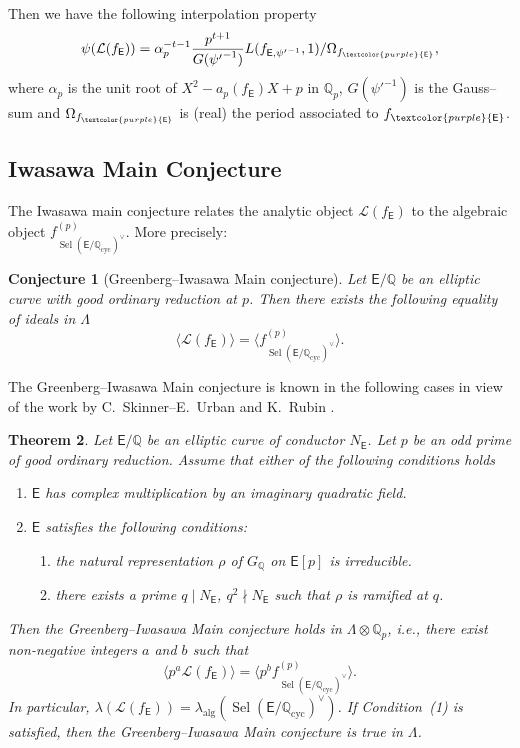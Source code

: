 \documentclass{amsart}
\newcommand{\DK}[1]{\textcolor{purple}{#1}}
\newtheorem{theorem}{Theorem}[section]
\newtheorem{conj}[theorem]{Conjecture}
\numberwithin{equation}{section}
\theoremstyle{remark}
\newcommand{\cyc}{\operatorname{cyc}}
\newcommand{\Sel}{\operatorname{Sel}}
\newcommand{\alg}{\operatorname{alg}}
\newcommand{\Qp}{\mathbb{Q}_p}
\newcommand{\Q}{\mathbb{Q}}
\newcommand{\EC}{\mathsf{E}}
\theoremstyle{plain} %
\begin{document}
Then we have the following interpolation property \cite[Section 14]{MTT}
\[
\psi(\mathcal{L}(f_{\EC}))=\alpha_p^{-t-1}\frac{p^{t+1}}{G({\psi'}^{-1})}L(f_{\EC, {\psi'}^{-1}},1)/\Omega_{f_{\DK{\EC}}},
\]
where $\alpha_p$ is the unit root of $X^2-a_p(f_{\EC})X+p$ in $\Qp$, $G(\psi'^{-1})$ is the Gauss--sum and $\Omega_{f_{\DK{\EC}}}$ is (real) the period associated to $f_{\DK{\EC}}$.

\subsection{Iwasawa Main Conjecture}
The Iwasawa main conjecture relates the analytic object $\mathcal{L}(f_{\EC})$ to the algebraic object $f^{(p)}_{\Sel(\EC/\Q_{\cyc})^\vee}$.
More precisely:

\begin{conj}[Greenberg--Iwasawa Main conjecture]
Let $\EC/\Q$ be an elliptic curve with good ordinary reduction at $p$.
Then there exists the following equality of ideals in $\Lambda$
\[
\langle \mathcal{L}(f_{\EC}) \rangle = \langle f^{(p)}_{\Sel(\EC/\Q_{\cyc})^\vee} \rangle.
\]
\end{conj}

The Greenberg--Iwasawa Main conjecture is known in the following cases in view of the work by C.~Skinner--E.~Urban \cite[Theorem 1]{skinner-urban} and K.~Rubin \cite[Theorem 12.3]{rubin}.

\begin{theorem}
\label{Iwasawa main}
Let $\EC/\Q$ be an elliptic curve of conductor $N_{\EC}$.
Let $p$ be an odd prime of good ordinary reduction.
Assume that either of the following conditions holds
\begin{enumerate}
    \item[\textup{(}1\textup{)}] $\EC$ has complex multiplication by an imaginary quadratic field.
    \item[\textup{(}2\textup{)}] $ \EC$ satisfies the following conditions:
        \begin{enumerate}
            \item[\textup{(}a\textup{)}] the natural representation $\rho$ of $G_\Q$ on $\EC[p]$ is irreducible.
            \item[\textup{(}b\textup{)}] there exists a prime $q\mid N_{\EC}$, $q^2\nmid N_{\EC}$ such that $\rho$ is ramified at $q$.
        \end{enumerate}
    \end{enumerate}
Then the Greenberg--Iwasawa Main conjecture holds in $\Lambda\otimes \Q_p$, i.e., there exist non-negative integers $a$ and $b$ such that 
\[
\langle p^a \mathcal{L}(f_{\EC}) \rangle =\langle p^bf_{\Sel(\EC/\Q_{\cyc})^\vee}^{(p)} \rangle.
\]
In particular, $\lambda(\mathcal{L}(f_\EC))=\lambda_{\alg}(\Sel(\EC/\Q_{\cyc})^\vee)$.
If Condition~\textup{(}1\textup{)} is satisfied, then the Greenberg--Iwasawa Main conjecture is true in $\Lambda$.
\end{theorem}
\end{document}
